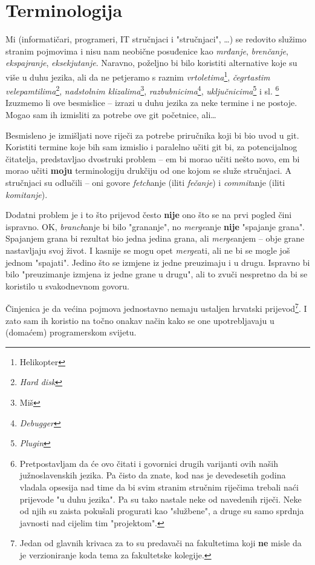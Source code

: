 \chapter*{Terminologija}

Mi (informatičari, programeri, IT stručnjaci i "stručnjaci", \dots) se redovito služimo stranim pojmovima i nisu nam neobične posuđenice kao \emph{mrđanje}, \emph{brenčanje}, \emph{ekspajranje}, \emph{eksekjutanje}.
Naravno, poželjno bi bilo koristiti alternative koje su više u duhu jezika, ali da ne petjeramo s raznim \emph{vrtoletima}\footnote{Helikopter}, \emph{čegrtastim velepamtilima}\footnote{\emph{Hard disk}}, \emph{nadstolnim klizalima}\footnote{Miš}, \emph{razbubnicima}\footnote{\emph{Debugger}}, \emph{uključnicima}\footnote{\emph{Plugin}} i sl.%
\footnote{Pretpostavljam da će ovo čitati i govornici drugih varijanti ovih naših južnoslavenskih jezika. Pa čisto da znate, kod nas je devedesetih godina vladala opsesija nad time da bi svim stranim stručnim riječima trebali naći prijevode "u duhu jezika". Pa su tako nastale neke od navedenih riječi. Neke od njih su zaista pokušali progurati kao "službene", a druge su samo sprdnja javnosti nad cijelim tim "projektom".}
Izuzmemo li ove besmislice -- izrazi u duhu jezika za neke termine i ne postoje.
Mogao sam ih izmisliti za potrebe ove git početnice, ali\dots

Besmisleno je izmišljati nove riječi za potrebe priručnika koji bi bio uvod u git.
Koristiti termine koje bih sam izmislio i paralelno učiti git bi, za potencijalnog čitatelja, predstavljao dvostruki problem -- em bi morao učiti nešto novo, em bi morao učiti \textbf{moju} terminologiju drukčiju od one kojom se služe stručnjaci.
A stručnjaci su odlučili -- oni govore \emph{fetch}anje (iliti \emph{fečanje}) i \emph{commit}anje (iliti \emph{komitanje}).

Dodatni problem je i to što prijevod često \textbf{nije} ono što se na prvi pogled čini ispravno.
OK, \emph{branch}anje bi bilo "grananje", no \emph{merge}anje \textbf{nije} "spajanje grana". 
Spajanjem grana bi rezultat bio jedna jedina grana, ali \emph{merge}anjem -- obje grane nastavljaju svoj život. 
I kasnije se mogu opet \emph{merge}ati, ali ne bi se mogle još jednom "spajati".
Jedino što se izmjene iz jedne preuzimaju i u drugu. 
Ispravno bi bilo "preuzimanje izmjena iz jedne grane u drugu", ali to zvuči nespretno da bi se koristilo u svakodnevnom govoru.

Činjenica je da većina pojmova jednostavno nemaju ustaljen hrvatski prijevod\footnote{Jedan od glavnih krivaca za to su predavači na fakultetima koji \textbf{ne} misle da je verzioniranje koda tema za fakultetske kolegije.}. 
I zato sam ih koristio na točno onakav način kako se one upotrebljavaju u (domaćem) programerskom svijetu.

